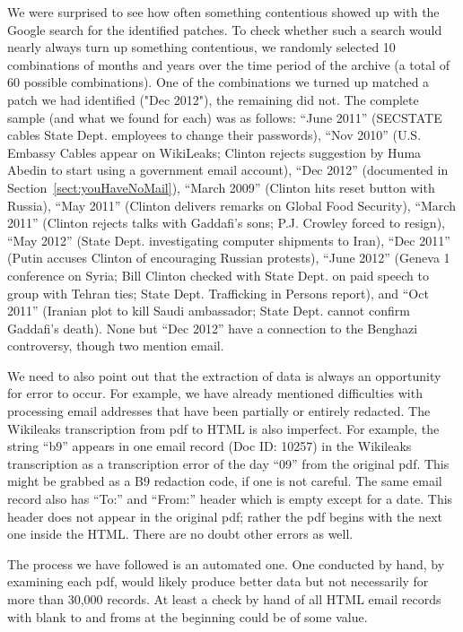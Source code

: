 \documentclass[journal]{vgtc}                %
\begin{document}
We were surprised to see how often something contentious showed up with the Google search for the identified patches.   To check whether such a search would nearly always turn up something contentious, we randomly selected 10 combinations of months and years over the time period of the archive (a total of 60 possible combinations).  One of the combinations we turned up matched a patch we had identified ("Dec 2012"), the remaining did not.  The complete sample (and what we found for each) was as follows:  ``June 2011''  (SECSTATE cables State Dept. employees to change their passwords), ``Nov 2010''  (U.S. Embassy Cables appear on WikiLeaks; Clinton rejects suggestion by Huma Abedin to start using  a government email account),   ``Dec 2012'' (documented in Section~\ref{sect:youHaveNoMail}), ``March 2009'' (Clinton hits reset button with Russia), ``May 2011'' (Clinton delivers remarks on Global Food Security), ``March 2011'' (Clinton rejects talks with Gaddafi's sons; P.J. Crowley forced to resign), ``May 2012'' (State Dept. investigating computer shipments to Iran), ``Dec 2011'' (Putin accuses Clinton of encouraging Russian protests), ``June 2012'' (Geneva 1 conference on Syria; Bill Clinton checked with State Dept. on paid speech to group with Tehran ties; State Dept. Trafficking in Persons report), and  ``Oct 2011'' (Iranian plot to kill Saudi ambassador; State Dept. cannot confirm Gaddafi's death).   None but ``Dec 2012'' have a connection to the Benghazi controversy, though two mention email.
 
 We need to also point out that the extraction of data is always an opportunity for error to occur.   For example, we have already mentioned difficulties with processing email addresses that have been partially or entirely redacted.  The Wikileaks transcription from pdf to HTML is also imperfect.  For example, the string ``b9''  appears in one email record (Doc ID: 10257) in the Wikileaks transcription\cite{errorWikileaks} as a transcription error of the day ``09'' from the original pdf.  This might be grabbed as a B9  redaction code, if one is not careful.  The same email record also has ``To:'' and ``From:'' header which is empty except for a date.  This header does not appear in the original pdf; rather the pdf begins with the next one inside the HTML.   There are no doubt other errors as well.  
 
 The process we have followed is an automated one.  One conducted by hand, by examining each pdf, would likely produce better data but not necessarily for more than 30,000 records.  At least a check by hand of all HTML email records with blank to and froms at the beginning could be of some value.
 
\end{document}
